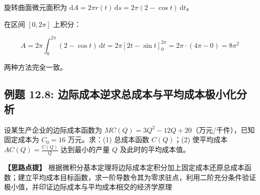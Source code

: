 \documentclass[11pt,a4paper,UTF8]{ctexart}
\begin{document}
\begin{solbox}[分步推导与答题规范]
旋转曲面微元面积为 $\mathrm{d}A = 2\pi r(t)\,\mathrm{d}s = 2\pi(2 - \cos t)\,\mathrm{d}t$。

在区间 $[0, 2\pi]$ 上积分：


\begin{equation*}
A = 2\pi \int_0^{2\pi} (2 - \cos t)\,\mathrm{d}t = 2\pi [2t - \sin t]_0^{2\pi} = 2\pi \cdot (4\pi - 0) = 8\pi^2
\end{equation*}


两种方法完全一致。
\end{solbox}


\subsection{例题 12.8: 边际成本逆求总成本与平均成本极小化分析}

设某生产企业的边际成本函数为 $MC(Q) = 3Q^2 - 12Q + 20$（万元/千件），已知固定成本为 $C_0 = 16$ 万元。求：(1) 总成本函数 $C(Q)$；(2) 使平均成本 $AC(Q) = \frac{C(Q)}{Q}$ 达到最小的产量 $Q$ 及此时的平均成本值。

\textbf{\color{DeepPurple}【思路点拨】} 根据微积分基本定理将边际成本定积分加上固定成本还原总成本函数；建立平均成本目标函数，求一阶导数令其为零求驻点，利用二阶充分条件验证极小值，并印证边际成本与平均成本相交的经济学原理
\end{document}
